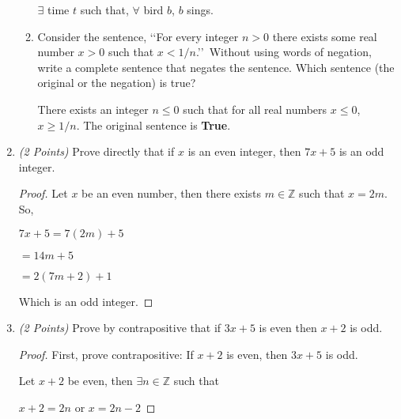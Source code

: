 \documentclass[10pt]{article} %
\newcommand{\Z}{\mathbb{Z}}
\newcommand{\points}[1]{{\it (#1 Points)}}
\begin{document}
\begin{enumerate}
\begin{enumerate}
  \bigskip
  
   $\exists$ time $t$ such that, $\forall$ bird $b$, $b$ sings.  
  
  \bigskip

      \item Consider the sentence, \lq\lq For every integer $n>0$ there exists some real number $x>0$ such that $x<1/n$.\rq\rq\ Without using words of negation, write a complete sentence that negates the sentence. Which sentence (the original or the negation) is true?
      
      \bigskip
      
       There exists an integer $n \leq 0$ such that for all real numbers $x \leq 0$, $x \geq 1/n$.  The original sentence is {\bf True}.  
      
      \bigskip
      
      \end{enumerate}





\item \points{2} Prove directly that if $x$ is an even integer, then $7x+5$ is an odd integer.

\bigskip


\begin{proof}
Let $x$ be an even number, then there exists $m\in \Z$ such that $x = 2m$.  So, 

$7x + 5 = 7 (2m) + 5$

$= 14m + 5$

$= 2(7m + 2) + 1$

Which is an odd integer.  

\end{proof}

\bigskip

 \item \points{2} Prove by contrapositive that if $3x+5$ is even then $x+2$ is odd.
 
 \bigskip
 
 
 \begin{proof}
 First, prove contrapositive: If $x + 2$ is even, then $3x + 5$ is odd.  
 
 Let $x + 2$ be even, then $\exists n\in \Z$ such that 
 
 $x + 2 = 2n$ or $x = 2n - 2$
 

\end{proof}
\end{enumerate}
\end{document}
